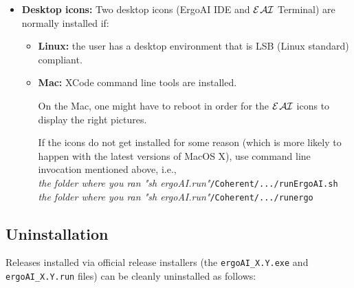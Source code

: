 \documentclass[11pt]{article}
\newcommand{\ERGO}{\mbox{\ensuremath{\cal{E}}\smaller{{\sc{RGO}}}}\xspace}
\newcommand{\ERGOAI}{\mbox{{\ensuremath{\cal{E}}\smaller{{\sc{RGO}}}}\ensuremath{\cal{AI}}}\xspace}
\begin{document}
\begin{itemize}
\begin{itemize}
    \textbf{Note 2:} Normally, \ERGO creates a directory called
    \texttt{.xsb} in the user's home directory: \texttt{\$HOME/.xsb}. If
    you are using \ERGOAI via the OS account that was also used to install
    \ERGOAI, nothing needs to be done. However, if the usage account differs
    from the installation account (which is often the case with servlets
    and other \emph{nologin} usage accounts) then it is necessary to tell
    Ergo where it can create the \texttt{.xsb} directory via the
    environment variable \texttt{XSB\_USER\_AUXDIR}. The location must have
    the \texttt{rwx} permissions for the usage account. For instance,
\begin{verbatim}
     export XSB_USER_AUXDIR=/opt/Coherent/ERGOAI/ErgoAI/.xsb 
\end{verbatim}
    \textbf{Note 3:} On \textbf{MacOS}, if you upgrade the OS, \ERGOAI must be
    reinstalled.
  \end{itemize}
\item[] \textbf{Desktop icons:} Two desktop icons (ErgoAI IDE and \ERGOAI
  Terminal) are normally installed if:
    \begin{itemize}
    \item[] \textbf{Linux:} the user has a desktop environment that is LSB
      (Linux standard) compliant.
    \item[] \textbf{Mac:}  XCode command line tools are installed.

      On the Mac, one might have to reboot in order for the \ERGOAI icons to
      display the right pictures.

      If the icons do not get installed for some reason (which is more
      likely to happen with the latest versions of MacOS X), use command
      line invocation mentioned above, i.e.,
      \\
      \emph{the folder where you ran "sh ergoAI.run"}\texttt{/Coherent/.../runErgoAI.sh}
      \\
      \emph{the folder where you ran "sh ergoAI.run"}\texttt{/Coherent/.../runergo} 
    \end{itemize}
\end{itemize}

\subsection{Uninstallation}\label{sec-uninstall}

Releases installed via official release installers (the
\texttt{ergoAI\_X.Y.exe} and \texttt{ergoAI\_X.Y.run}  files)
can be cleanly uninstalled as follows:
\end{document}
